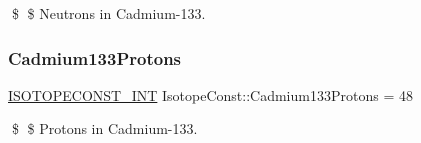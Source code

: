 \$ \$ Neutrons in Cadmium-\/133. \mbox{\label{group___isotope_const-_cadmium-_cd133_gafab4e213291e679e93f83bdf75817143}} 
\subsubsection{\texorpdfstring{Cadmium133\+Protons}{Cadmium133Protons}}
{\footnotesize\ttfamily \mbox{\hyperlink{group___isotope_const-_macros_ga5f18360b3e99483a35c32d789e62621c}{I\+S\+O\+T\+O\+P\+E\+C\+O\+N\+S\+T\+\_\+\+I\+NT}} Isotope\+Const\+::\+Cadmium133\+Protons = 48}

\$ \$ Protons in Cadmium-\/133. 